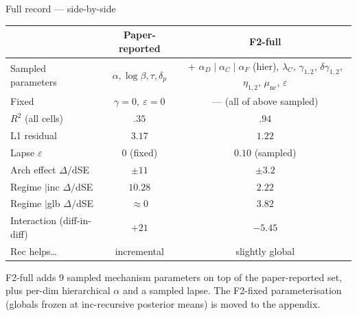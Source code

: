 \documentclass[10pt,aspectratio=169]{beamer}
\newcommand{\main}[1]{\textcolor{CSP-main-dark}{\textbf{#1}}}
\newcommand{\muted}[1]{\textcolor{CSP-text-light}{#1}}
\begin{document}
\begin{frame}{Full record --- side-by-side}
\small
\begin{center}
\begin{tabular}{lcc}
\toprule
                             & Paper-reported   & \main{F2-full} \\
\midrule
Sampled parameters           & $\alpha, \log\beta, \tau, \delta_p$ & + $\alpha_D\!\mid\!\alpha_C\!\mid\!\alpha_F$ (hier), $\lambda_C$, $\gamma_{1,2}$, $\delta\gamma_{1,2}$, $\eta_{1,2}$, $\mu_\mathrm{nc}$, $\varepsilon$ \\
Fixed                        & $\gamma\!=\!0,\ \varepsilon\!=\!0$   & --- (all of above sampled) \\
\midrule
$R^2$ (all cells)            & $.35$       & \main{$.94$} \\
L1 residual                  & $3.17$      & \main{$1.22$} \\
Lapse $\varepsilon$          & $0$ (fixed) & $0.10$ (sampled) \\
\midrule
Arch effect $\Delta/$dSE     & $\pm 11$    & $\pm 3.2$ \\
Regime $|$inc $\Delta/$dSE   & $10.28$     & $2.22$ \\
Regime $|$glb $\Delta/$dSE   & $\approx 0$ & $3.82$ \\
Interaction (diff-in-diff)   & $+21$       & $-5.45$ \\
\midrule
Rec helps\ldots              & incremental & slightly global \\
\bottomrule
\end{tabular}
\end{center}

\vspace{0.6em}
\footnotesize \muted{F2-full adds 9 sampled mechanism parameters on top of the paper-reported set, plus per-dim hierarchical $\alpha$ and a sampled lapse. The F2-fixed parameterisation (globals frozen at inc-recursive posterior means) is moved to the appendix.}
\end{frame}
\end{document}
